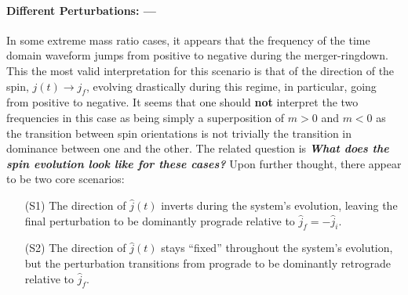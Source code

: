 \documentclass[twocolumn,prd,floatfix,preprintnumbers,a4paper,nofootinbib,superscriptaddress]{revtex4-1}
\def\j{j_f}
\begin{document}
{\paragraph{Different Perturbations: --- } In some extreme mass ratio cases, it appears that the frequency of the time domain waveform jumps from positive to negative during the merger-ringdown.
%
This the most valid interpretation for this scenario is that of the direction of the spin, $j(t) \rightarrow \j{}$, evolving drastically during this regime, in particular, going from positive to negative.
%
It seems that one should \textbf{not} interpret the two frequencies in this case as being simply a superposition of $m>0$ and $m<0$ as the transition between spin orientations is not trivially the transition in dominance between one \qnm{} and the other.
%
The related question is \textbf{\textit{What does the spin evolution look like for these cases?}}
%
Upon further thought, there appear to be two core scenarios:
%
\begin{itemize}
	\item[(S1)] The direction of $\hat{j}(t)$ inverts during the system's evolution, leaving the final perturbation to be dominantly prograde relative to $\hat{j}_f=-\hat{j}_i$.
	\item[(S2)] The direction of $\hat{j}(t)$ stays ``fixed'' throughout the system's evolution, but the perturbation transitions from prograde to be dominantly retrograde relative to $\hat{j}_f$.
\end{itemize}
%
}
\end{document}
